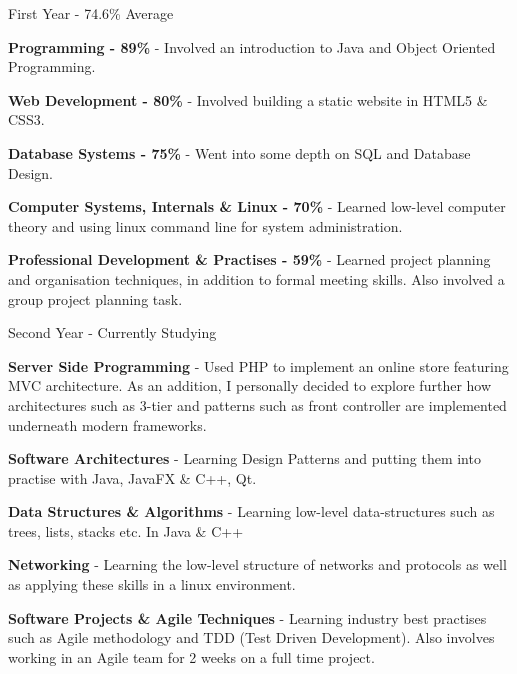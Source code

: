 
\begin{cventries}
      \cventry
        {First Year - 74.6\% Average}
        {}
        {}
        {}
        {
          \begin{cvitems} %
            \item {\textbf{Programming - 89\%} - Involved an introduction to Java and Object Oriented Programming.}
            \item {\textbf{Web Development - 80\%} - Involved building a static website in HTML5 \& CSS3.}
            \item {\textbf{Database Systems - 75\%} - Went into some depth on SQL and Database Design.}
            \item {\textbf{Computer Systems, Internals \& Linux - 70\%} - Learned low-level computer theory and using linux command line for system administration.}
            \item {\textbf{Professional Development \& Practises - 59\%} - Learned project planning and organisation techniques, in addition to formal meeting skills. Also involved a group project planning task.}
          \end{cvitems}
        }
\end{cventries}

\begin{cventries}
      \cventry
        {Second Year - Currently Studying}
        {}
        {}
        {}
        {
          \begin{cvitems} %
            \item {\textbf{Server Side Programming} - Used PHP to implement an online store featuring MVC architecture. As an addition, I personally decided to explore further how architectures such as 3-tier and patterns such as front controller are implemented underneath modern frameworks.}
            \item {\textbf{Software Architectures} - Learning Design Patterns and putting them into practise with Java, JavaFX \& C++, Qt.}
            \item {\textbf{Data Structures \& Algorithms} - Learning low-level data-structures such as trees, lists, stacks etc. In Java \& C++} 
            \item {\textbf{Networking} - Learning the low-level structure of networks and protocols as well as applying these skills in a linux environment.}
            \item {\textbf{Software Projects \& Agile Techniques} - Learning industry best practises such as Agile methodology and TDD (Test Driven Development). Also involves working in an Agile team for 2 weeks on a full time project.}
          \end{cvitems}
        }
\end{cventries}
